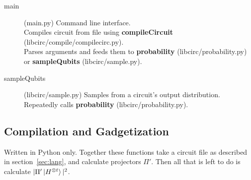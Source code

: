 \documentclass[11pt]{article}
\begin{document}
\begin{description}
    \item[main] (main.py) Command line interface.\\ Compiles circuit from file using \textbf{compileCircuit} (libcirc/compile/compilecirc.py).\\ Parses arguments and feeds them to \textbf{probability} (libcirc/probability.py)\\ or \textbf{sampleQubits} (libcirc/sample.py).
    \item[sampleQubits] (libcirc/sample.py) Samples from a circuit's output distribution.\\
        Repeatedly calls \textbf{probability} (libcirc/probability.py).
\end{description}

\subsection{Compilation and Gadgetization}

Written in Python only. Together these functions take a circuit file as described in section~\ref{sec:lang}, and calculate projectors $\Pi'$. Then all that is left to do is calculate $|\Pi'\ket{H^{\otimes t}}|^2$.
\end{document}

